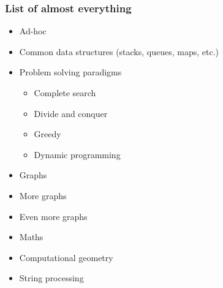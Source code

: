 \documentclass[svgnames,dvipsnames,usenames]{beamer}
\begin{document}
\begin{frame}
    \frametitle{List of almost everything}
    \begin{itemize}
            \pause
        \item Ad-hoc
            \pause
        \item Common data structures (stacks, queues, maps, etc.)
            \pause
        \item Problem solving paradigms
            \begin{itemize}
                    \pause
                \item Complete search
                    \pause
                \item Divide and conquer
                    \pause
                \item Greedy
                    \pause
                \item Dynamic programming
            \end{itemize}
            \pause
        \item Graphs
            \pause
        \item More graphs
            \pause
        \item Even more graphs
            \pause
        \item Maths
            \pause
        \item Computational geometry
            \pause
        \item String processing
    \end{itemize}
\end{frame}
\end{document}
